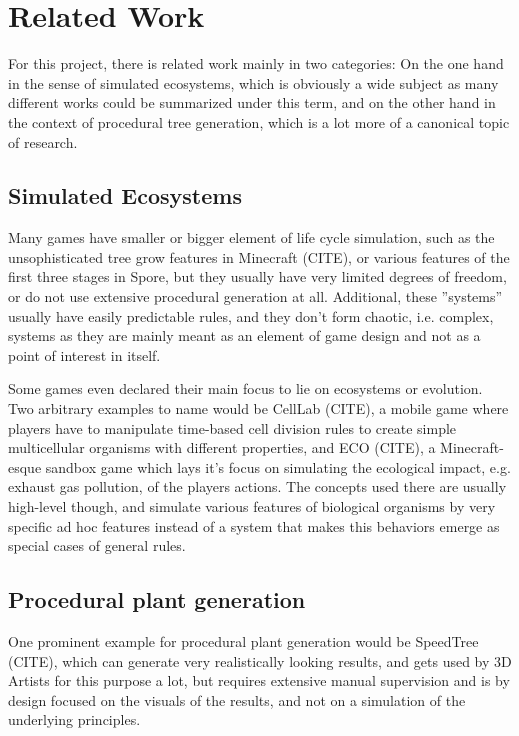 \documentclass[11pt]{scrartcl}
\begin{document}
\section{Related Work}

For this project, there is related work mainly in two categories: On the one hand in the sense of simulated ecosystems, which is obviously a wide subject as many different works could be summarized under this term, and on the other hand in the context of procedural tree generation, which is a lot more of a canonical topic of research.

\subsection{Simulated Ecosystems}

Many games have smaller or bigger element of life cycle simulation, such as the unsophisticated tree grow features in Minecraft (CITE), or various features of the first three stages in Spore, but they usually have very limited degrees of freedom, or do not use extensive procedural generation at all. Additional, these ''systems'' usually have easily predictable rules, and they don't form chaotic, i.e. complex, systems as they are mainly meant as an element of game design and not as a point of interest in itself.

Some games even declared their main focus to lie on ecosystems or evolution. Two arbitrary examples to name would be CellLab (CITE), a mobile game where players have to manipulate time-based cell division rules to create simple multicellular organisms with different properties, and ECO (CITE), a Minecraft-esque sandbox game which lays it's focus on simulating the ecological impact, e.g. exhaust gas pollution, of the players actions. The concepts used there are usually high-level though, and simulate various features of biological organisms by very specific ad hoc features instead of a system that makes this behaviors emerge as special cases of general rules.

\subsection{Procedural plant generation}
One prominent example for procedural plant generation would be SpeedTree (CITE), which can generate very realistically looking results, and gets used by 3D Artists for this purpose a lot, but requires extensive manual supervision and is by design focused on the visuals of the results, and not on a simulation of the underlying principles. 
\end{document}
